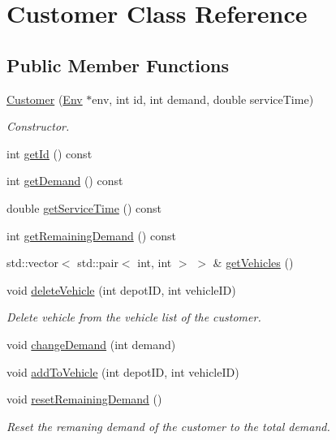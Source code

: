 \hypertarget{class_customer}{}\section{Customer Class Reference}
\label{class_customer}
\subsection*{Public Member Functions}
\begin{DoxyCompactItemize}
\item 
\hyperlink{class_customer_aaa83636312ec0431684c8d898a21ad69}{Customer} (\hyperlink{class_env}{Env} $\ast$env, int id, int demand, double service\+Time)
\begin{DoxyCompactList}\small\item\em Constructor. \end{DoxyCompactList}\item 
int \hyperlink{class_customer_acdbe83bbd49996e9a3b62820433b6f5d}{get\+Id} () const
\item 
int \hyperlink{class_customer_ac1714e36409416fd737d426f14c1781a}{get\+Demand} () const
\item 
double \hyperlink{class_customer_aa9c2a49942a8c7de055ee902e5e72127}{get\+Service\+Time} () const
\item 
int \hyperlink{class_customer_ab7ab4f52f6fd1ced79b7cecdde4675ec}{get\+Remaining\+Demand} () const
\item 
std\+::vector$<$ std\+::pair$<$ int, int $>$ $>$ \& \hyperlink{class_customer_ad01e6465075cfdb95bd42999d5330bdf}{get\+Vehicles} ()
\item 
void \hyperlink{class_customer_ac4d2860ec8491a4ae65f467d9c52ca27}{delete\+Vehicle} (int depot\+ID, int vehicle\+ID)
\begin{DoxyCompactList}\small\item\em Delete vehicle from the vehicle list of the customer. \end{DoxyCompactList}\item 
void \hyperlink{class_customer_a2c3f4f6dcfdb9445493385b2cdca524e}{change\+Demand} (int demand)
\item 
void \hyperlink{class_customer_ace23d6d0c410c70f38bc99ac383201b5}{add\+To\+Vehicle} (int depot\+ID, int vehicle\+ID)
\item 
\mbox{\label{class_customer_a0f06bdce903a3efcffe01008183b19bc}} 
void \hyperlink{class_customer_a0f06bdce903a3efcffe01008183b19bc}{reset\+Remaining\+Demand} ()
\begin{DoxyCompactList}\small\item\em Reset the remaning demand of the customer to the total demand. \end{DoxyCompactList}\end{DoxyCompactItemize}
